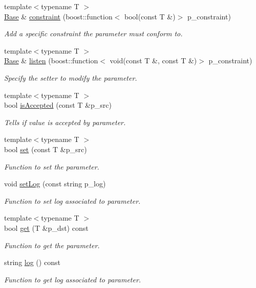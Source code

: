 \begin{DoxyCompactItemize}
{\footnotesize template$<$typename T $>$ }\\\hyperlink{classxtd_1_1servers_1_1param_1_1Base}{Base} \& \hyperlink{classxtd_1_1servers_1_1param_1_1Base_afa9ec13039176f5e8da4c1ac6dfd4063}{constraint} (boost\-::function$<$ bool(const T \&)$>$ p\-\_\-constraint)
\begin{DoxyCompactList}\small\item\em Add a specific constraint the parameter must conform to. \end{DoxyCompactList}\item 
{\footnotesize template$<$typename T $>$ }\\\hyperlink{classxtd_1_1servers_1_1param_1_1Base}{Base} \& \hyperlink{classxtd_1_1servers_1_1param_1_1Base_af34d052ef13b435479838c0372f1edb2}{listen} (boost\-::function$<$ void(const T \&, const T \&)$>$ p\-\_\-constraint)
\begin{DoxyCompactList}\small\item\em Specify the setter to modify the parameter. \end{DoxyCompactList}\item 
{\footnotesize template$<$typename T $>$ }\\bool \hyperlink{classxtd_1_1servers_1_1param_1_1Base_a6161111b66cf64a5b953bd978b498fe8}{is\-Accepted} (const T \&p\-\_\-src)
\begin{DoxyCompactList}\small\item\em Tells if value is accepted by parameter. \end{DoxyCompactList}\item 
{\footnotesize template$<$typename T $>$ }\\bool \hyperlink{classxtd_1_1servers_1_1param_1_1Base_abff2c36296d9d309baafe94e7fd65834}{set} (const T \&p\-\_\-src)
\begin{DoxyCompactList}\small\item\em Function to set the parameter. \end{DoxyCompactList}\item 
void \hyperlink{classxtd_1_1servers_1_1param_1_1Base_a47d5b5e494732932d25fa992e0a06190}{set\-Log} (const string p\-\_\-log)
\begin{DoxyCompactList}\small\item\em Function to set log associated to parameter. \end{DoxyCompactList}\item 
{\footnotesize template$<$typename T $>$ }\\bool \hyperlink{classxtd_1_1servers_1_1param_1_1Base_a48c6b4f36d84c640cc68b347090a6ec5}{get} (T \&p\-\_\-dst) const 
\begin{DoxyCompactList}\small\item\em Function to get the parameter. \end{DoxyCompactList}\item 
string \hyperlink{classxtd_1_1servers_1_1param_1_1Base_a48e7dac1fe3c43d62057e7a92e4bece9}{log} () const 
\begin{DoxyCompactList}\small\item\em Function to get log associated to parameter. \end{DoxyCompactList}\end{DoxyCompactItemize}
